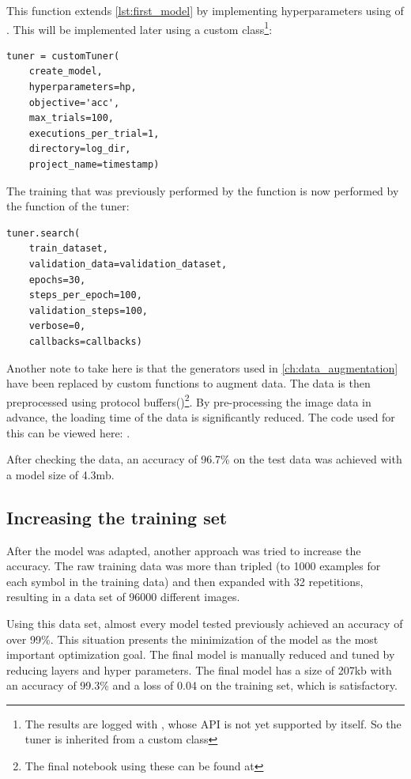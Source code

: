 This function extends \ref{lst:first_model} by implementing hyperparameters using  of .
This will be implemented later using a custom class\footnote{The results are logged with , whose API is not yet supported by  itself. So the tuner is inherited from a custom class}:

\begin{lstlisting}
tuner = customTuner(
    create_model,
    hyperparameters=hp,
    objective='acc',
    max_trials=100,
    executions_per_trial=1,
    directory=log_dir,
    project_name=timestamp)
\end{lstlisting}

The training that was previously performed by the  function is now performed by the  function of the tuner:

\begin{lstlisting}
tuner.search(
    train_dataset,
    validation_data=validation_dataset,
    epochs=30,
    steps_per_epoch=100,
    validation_steps=100,
    verbose=0,
    callbacks=callbacks)
\end{lstlisting}

Another note to take here is that the generators used in \ref{ch:data_augmentation} have been replaced by custom functions to augment data. The data is then preprocessed using protocol buffers()\footnote{The final notebook using these can be found at }.
By pre-processing the image data in advance, the loading time of the data is significantly reduced.
The code used for this can be viewed here: .

After checking the data, an accuracy of 96.7\% on the test data was achieved with a model size of 4.3mb.

\subsection{Increasing the training set}

After the model was adapted, another approach was tried to increase the accuracy.
The raw training data was more than tripled (to 1000 examples for each symbol in the training data) and then expanded with 32 repetitions, resulting in a data set of 96000 different images.

Using this data set, almost every model tested previously achieved an accuracy of over 99\%.
This situation presents the minimization of the model as the most important optimization goal.
The final model is manually reduced and tuned by reducing layers and hyper parameters.
The final model has a size of 207kb with an accuracy of 99.3\% and a loss of 0.04 on the training set, which is satisfactory.

